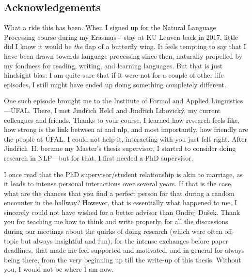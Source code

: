 \documentclass[12pt,notitlepage,a4paper,openright]{report}
\begin{document}
\subsection*{Acknowledgements}
{
    What a ride this has been. When I signed up for the Natural Language Processing course during my Erasmus+ stay at KU Leuven back in 2017, little did I know it would be \emph{the} flap of a butterfly wing. It feels tempting to say that I have been drawn towards language processing since then, naturally propelled by my fondness for reading, writing, and learning languages. But that is just hindsight bias: I am quite sure that if it were not for a couple of other life episodes, I still might have ended up doing something completely different.

    One such episode brought me to the Institute of Formal and Applied Linguistics---ÚFAL. There, I met Jindřich Helcl and Jindřich Libovický, my current colleagues and friends. Thanks to your course, I learned how research feels like, how strong is the link between \acs{ai} and \acs{nlp}, and most importantly, how friendly are the people at ÚFAL. I could not help it, interacting with you just felt right. After Jindřich~H. became my Master's thesis supervisor, I started to consider doing research in NLP---but for that, I first needed a PhD supervisor.

    I once read that the PhD supervisor/student relationship is akin to marriage, as it leads to intense personal interactions over several years. If that is the case, what are the chances that you find a perfect person for that during a random encounter in the hallway?
    However, that is essentially what happened to me.
    I sincerely could not have wished for a better advisor than Ondřej Dušek. Thank you for teaching me how to think and write properly, for all the discussions during our meetings about the quirks of doing research (which were often off-topic but always insightful and fun), for the intense exchanges before paper deadlines, that made me feel supported and motivated, and in general for always being there, from the very beginning up till the write-up of this thesis. Without you, I would not be where I am now.

}
\end{document}
